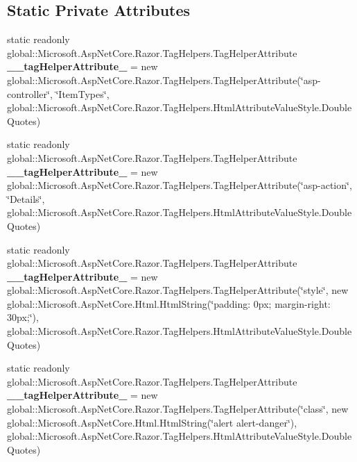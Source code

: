 \subsection*{Static Private Attributes}
\begin{DoxyCompactItemize}
\item 
\mbox{\label{class_asp_net_core_1_1_views___home___index_aeaeb4540ce9a051559e9c0bd61e7cab4}} 
static readonly global\+::\+Microsoft.\+Asp\+Net\+Core.\+Razor.\+Tag\+Helpers.\+Tag\+Helper\+Attribute {\bfseries \+\_\+\+\_\+tag\+Helper\+Attribute\+\_} = new global\+::\+Microsoft.\+Asp\+Net\+Core.\+Razor.\+Tag\+Helpers.\+Tag\+Helper\+Attribute(\char`\"{}asp-\/controller\char`\"{}, \char`\"{}Item\+Types\char`\"{}, global\+::\+Microsoft.\+Asp\+Net\+Core.\+Razor.\+Tag\+Helpers.\+Html\+Attribute\+Value\+Style.\+Double\+Quotes)
\item 
\mbox{\label{class_asp_net_core_1_1_views___home___index_ac2f776457060aa65f0054be51718390d}} 
static readonly global\+::\+Microsoft.\+Asp\+Net\+Core.\+Razor.\+Tag\+Helpers.\+Tag\+Helper\+Attribute {\bfseries \+\_\+\+\_\+tag\+Helper\+Attribute\+\_} = new global\+::\+Microsoft.\+Asp\+Net\+Core.\+Razor.\+Tag\+Helpers.\+Tag\+Helper\+Attribute(\char`\"{}asp-\/action\char`\"{}, \char`\"{}Details\char`\"{}, global\+::\+Microsoft.\+Asp\+Net\+Core.\+Razor.\+Tag\+Helpers.\+Html\+Attribute\+Value\+Style.\+Double\+Quotes)
\item 
\mbox{\label{class_asp_net_core_1_1_views___home___index_af1459621c37307961792e5a0ea581160}} 
static readonly global\+::\+Microsoft.\+Asp\+Net\+Core.\+Razor.\+Tag\+Helpers.\+Tag\+Helper\+Attribute {\bfseries \+\_\+\+\_\+tag\+Helper\+Attribute\+\_} = new global\+::\+Microsoft.\+Asp\+Net\+Core.\+Razor.\+Tag\+Helpers.\+Tag\+Helper\+Attribute(\char`\"{}style\char`\"{}, new global\+::\+Microsoft.\+Asp\+Net\+Core.\+Html.\+Html\+String(\char`\"{}padding\+: 0px; margin-\/right\+: 30px;\char`\"{}), global\+::\+Microsoft.\+Asp\+Net\+Core.\+Razor.\+Tag\+Helpers.\+Html\+Attribute\+Value\+Style.\+Double\+Quotes)
\item 
\mbox{\label{class_asp_net_core_1_1_views___home___index_ad72e9d6465a00f3e59c65517f658c245}} 
static readonly global\+::\+Microsoft.\+Asp\+Net\+Core.\+Razor.\+Tag\+Helpers.\+Tag\+Helper\+Attribute {\bfseries \+\_\+\+\_\+tag\+Helper\+Attribute\+\_} = new global\+::\+Microsoft.\+Asp\+Net\+Core.\+Razor.\+Tag\+Helpers.\+Tag\+Helper\+Attribute(\char`\"{}class\char`\"{}, new global\+::\+Microsoft.\+Asp\+Net\+Core.\+Html.\+Html\+String(\char`\"{}alert alert-\/danger\char`\"{}), global\+::\+Microsoft.\+Asp\+Net\+Core.\+Razor.\+Tag\+Helpers.\+Html\+Attribute\+Value\+Style.\+Double\+Quotes)

\end{DoxyCompactItemize}
